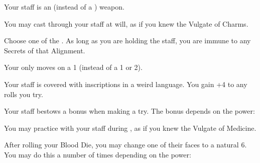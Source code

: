 \cbreak


Your staff is an \INT (instead of a \DEX) weapon.


You may cast  through your staff at will, as if you knew the Vulgate of Charms.


Choose one of the . As long as you are holding the staff, you are immune to any Secrets of that Alignment.


Your  only moves \DCDOWN on a 1 (instead of a 1 or 2).


Your staff is covered with inscriptions in a weird language.  You gain +4 to any  rolls you try.


Your staff bestows a bonus when making a  try. The bonus depends on the power:



You may practice  with your staff during , as if you knew the Vulgate of Medicine.

\newpage


After rolling your Blood Die, you may change one of their faces to a natural 6. You may do this a number of times depending on the power:


